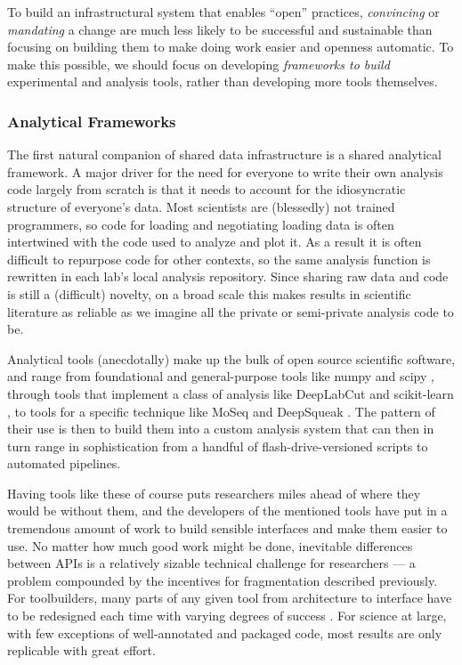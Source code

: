 \documentclass[10pt]{article}
\begin{document}
\begin{multicols}{2}
To build an infrastructural system that enables ``open'' practices,
\emph{convincing} or \emph{mandating} a change are much less likely to
be successful and sustainable than focusing on building them to make
doing work easier and openness automatic. To make this possible, we
should focus on developing \emph{frameworks to build} experimental and
analysis tools, rather than developing more tools themselves.

\hypertarget{analytical-frameworks}{%
\subsubsection{Analytical Frameworks}\label{analytical-frameworks}}

The first natural companion of shared data infrastructure is a shared
analytical framework. A major driver for the need for everyone to write
their own analysis code largely from scratch is that it needs to account
for the idiosyncratic structure of everyone's data. Most scientists are
(blessedly) not trained programmers, so code for loading and negotiating
loading data is often intertwined with the code used to analyze and plot
it. As a result it is often difficult to repurpose code for other
contexts, so the same analysis function is rewritten in each lab's local
analysis repository. Since sharing raw data and code is still a
(difficult) novelty, on a broad scale this makes results in scientific
literature as reliable as we imagine all the private or semi-private
analysis code to be.

Analytical tools (anecdotally) make up the bulk of open source
scientific software, and range from foundational and general-purpose
tools like numpy \cite{harrisArrayProgrammingNumPy2020}  and
scipy \cite{virtanenSciPyFundamentalAlgorithms2020} , through
tools that implement a class of analysis like DeepLabCut \cite{mathisDeepLabCutMarkerlessPose2018a}  and scikit-learn \cite{pedregosaScikitlearnMachineLearning2011} , to tools for a specific
technique like MoSeq \cite{wiltschkoRevealingStructurePharmacobehavioral2020}  and DeepSqueak
\cite{coffeyDeepSqueakDeepLearningbased2019} . The pattern of
their use is then to build them into a custom analysis system that can
then in turn range in sophistication from a handful of
flash-drive-versioned scripts to automated pipelines.

Having tools like these of course puts researchers miles ahead of where
they would be without them, and the developers of the mentioned tools
have put in a tremendous amount of work to build sensible interfaces and
make them easier to use. No matter how much good work might be done,
inevitable differences between APIs is a relatively sizable technical
challenge for researchers --- a problem compounded by the incentives for
fragmentation described previously. For toolbuilders, many parts of any
given tool from architecture to interface have to be redesigned each
time with varying degrees of success . For science at large, with few
exceptions of well-annotated and packaged code, most results are only
replicable with great effort.


\end{multicols}
\end{document}
